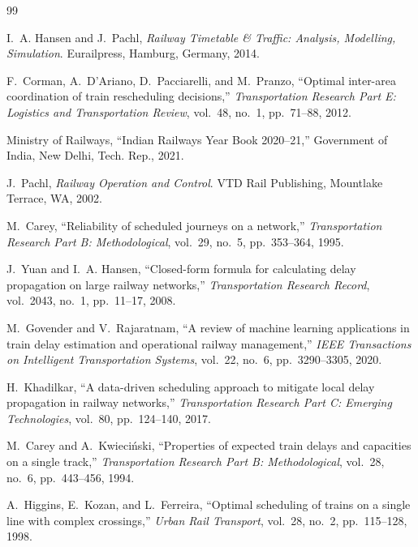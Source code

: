 \documentclass[11pt,a4paper]{article}
\renewenvironment{thebibliography}[1]{
  \begin{oldthebibliography}{#1}
    \setlength{\itemsep}{0.15em}
    \setlength{\parskip}{0em}
}
{
  \end{oldthebibliography}
}
\begin{document}
\begin{thebibliography}{99}

I.~A. Hansen and J.~Pachl, \emph{Railway Timetable \& Traffic: Analysis, Modelling, Simulation}. Eurailpress, Hamburg, Germany, 2014.

F.~Corman, A.~D'Ariano, D.~Pacciarelli, and M.~Pranzo, ``Optimal inter-area coordination of train rescheduling decisions,'' \emph{Transportation Research Part E: Logistics and Transportation Review}, vol.~48, no.~1, pp.~71--88, 2012.

Ministry of Railways, ``Indian Railways Year Book 2020--21,'' Government of India, New Delhi, Tech. Rep., 2021.

J.~Pachl, \emph{Railway Operation and Control}. VTD Rail Publishing, Mountlake Terrace, WA, 2002.

M.~Carey, ``Reliability of scheduled journeys on a network,'' \emph{Transportation Research Part B: Methodological}, vol.~29, no.~5, pp.~353--364, 1995.

J.~Yuan and I.~A. Hansen, ``Closed-form formula for calculating delay propagation on large railway networks,'' \emph{Transportation Research Record}, vol.~2043, no.~1, pp.~11--17, 2008.

M.~Govender and V.~Rajaratnam, ``A review of machine learning applications in train delay estimation and operational railway management,'' \emph{IEEE Transactions on Intelligent Transportation Systems}, vol.~22, no.~6, pp.~3290--3305, 2020.

H.~Khadilkar, ``A data-driven scheduling approach to mitigate local delay propagation in railway networks,'' \emph{Transportation Research Part C: Emerging Technologies}, vol.~80, pp.~124--140, 2017.

M.~Carey and A.~Kwieci{\'n}ski, ``Properties of expected train delays and capacities on a single track,'' \emph{Transportation Research Part B: Methodological}, vol.~28, no.~6, pp.~443--456, 1994.

A.~Higgins, E.~Kozan, and L.~Ferreira, ``Optimal scheduling of trains on a single line with complex crossings,'' \emph{Urban Rail Transport}, vol.~28, no.~2, pp.~115--128, 1998.


\end{thebibliography}
\end{document}
